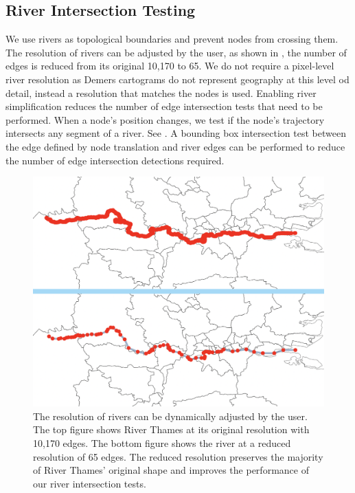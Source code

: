 

\subsection{River Intersection Testing}

We use rivers as topological boundaries and prevent nodes from crossing them. The resolution of rivers can be adjusted by the user, as shown in , the number of edges is reduced from its original 10,170 to 65. We do not require a pixel-level river resolution as Demers cartograms do not represent geography at this level od detail, instead a resolution that matches the nodes is used. Enabling river simplification reduces the number of edge intersection tests that need to be performed. When a node's position changes, we test if the node's trajectory intersects any segment of a river. See . A bounding box intersection test between the edge defined by node translation and river edges can be performed to reduce the number of edge intersection detections required.


{
\begin{figure}[tb!]
    \centering
    \includegraphics[width=\columnwidth]{figure/river_resolution.png}
    \caption{The resolution of rivers can be dynamically adjusted by the user. The top figure shows River Thames at its original resolution with 10,170 edges. The bottom figure shows the river at a  reduced resolution of 65 edges. The reduced resolution preserves the majority of River Thames' original shape and improves the performance of our river intersection tests.}
    \label{fig:river resolution}
\end{figure}
}


